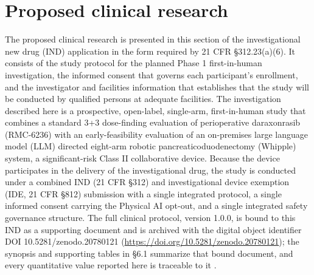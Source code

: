 \section{Proposed clinical research}

The proposed clinical research is presented in this section of the investigational
new drug (IND) application in the form required by 21 CFR \S 312.23(a)(6). It
consists of the study protocol for the planned Phase 1 first-in-human
investigation, the informed consent that governs each participant's enrollment,
and the investigator and facilities information that establishes that the study
will be conducted by qualified persons at adequate facilities. The investigation
described here is a prospective, open-label, single-arm, first-in-human study that
combines a standard 3+3 dose-finding evaluation of perioperative daraxonrasib
(RMC-6236) with an early-feasibility evaluation of an on-premises large language
model (LLM) directed eight-arm robotic pancreaticoduodenectomy (Whipple) system, a
significant-risk Class II collaborative device. Because the device participates in
the delivery of the investigational drug, the study is conducted under a combined
IND (21 CFR \S 312) and investigational device exemption (IDE, 21 CFR \S 812)
submission with a single integrated protocol, a single informed consent carrying
the Physical AI opt-out, and a single integrated safety governance structure. The
full clinical protocol, version 1.0.0, is bound to this IND as a supporting
document and is archived with the digital object identifier
DOI 10.5281/zenodo.20780121
(\href{https://doi.org/10.5281/zenodo.20780121}{https://doi.org/10.5281/zenodo.20780121});
the synopsis and supporting tables in \S 6.1 summarize that bound document, and
every quantitative value reported here is traceable to it
\cite{daraxwhipple,onpremwhippl}.

